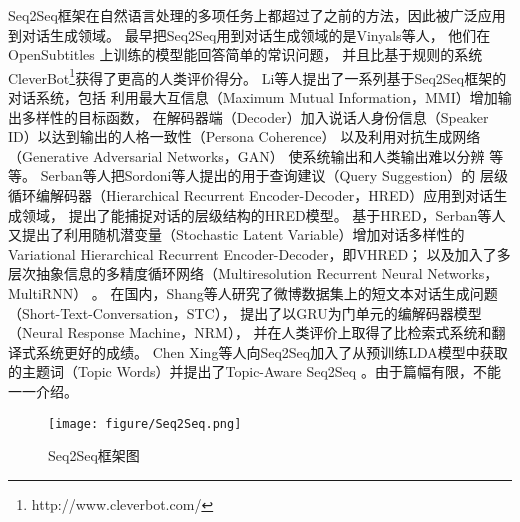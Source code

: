 Seq2Seq框架在自然语言处理的多项任务上都超过了之前的方法，因此被广泛应用到对话生成领域。
最早把Seq2Seq用到对话生成领域的是Vinyals等人，
他们在OpenSubtitles
上训练的模型能回答简单的常识问题，
并且比基于规则的系统CleverBot\footnote{http://www.cleverbot.com/}获得了更高的人类评价得分。
Li等人提出了一系列基于Seq2Seq框架的对话系统，包括
利用最大互信息（Maximum Mutual Information，MMI）增加输出多样性的目标函数，
在解码器端（Decoder）加入说话人身份信息（Speaker ID）以达到输出的人格一致性（Persona Coherence）
以及利用对抗生成网络（Generative Adversarial Networks，GAN）
使系统输出和人类输出难以分辨
等等。
Serban等人把Sordoni等人提出的用于查询建议（Query Suggestion）的
层级循环编解码器（Hierarchical Recurrent Encoder-Decoder，HRED）应用到对话生成领域， 提出了能捕捉对话的层级结构的HRED模型。
基于HRED，Serban等人又提出了利用随机潜变量（Stochastic Latent Variable）增加对话多样性的Variational Hierarchical Recurrent Encoder-Decoder，即VHRED；
以及加入了多层次抽象信息的多精度循环网络（Multiresolution Recurrent Neural Networks，MultiRNN）
。
在国内，Shang等人研究了微博数据集上的短文本对话生成问题（Short-Text-Conversation，STC），
提出了以GRU为门单元的编解码器模型（Neural Response Machine，NRM），
并在人类评价上取得了比检索式系统和翻译式系统更好的成绩。
Chen Xing等人向Seq2Seq加入了从预训练LDA模型中获取的主题词（Topic Words）并提出了Topic-Aware Seq2Seq
。由于篇幅有限，不能一一介绍。

\begin{figure}[H]
    \centering
    \texttt{[image: figure/Seq2Seq.png]}
    \caption{Seq2Seq框架图}
    \label{fig:Seq2Seq}
\end{figure}

